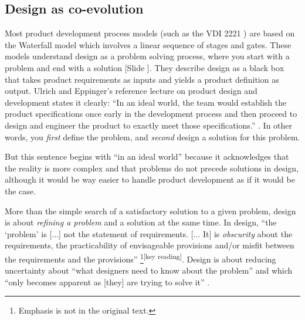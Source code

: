\documentclass{article}
\newcounter{slide}
\begin{document}
\subsection{Design as co-evolution}
\label{sec:coevolution}
Most product development process models (such as the VDI 2221 \cite{vdi1993design}) are based on the Waterfall model which involves a linear sequence of stages and gates. These models understand design as a problem solving process, where you start with a problem and end with a solution {\color{blue}[Slide ]}. They describe design as a black box that takes product requirements as inputs and yields a product definition as output. Ulrich and Eppinger's reference lecture on product design and development states it clearly: ``In an ideal world, the team would establish the product specifications once early in the development process and then proceed to design and engineer the product to exactly meet those specifications.'' \cite[p. 73]{ulrichProductDesignDevelopment2011}. In other words, you \emph{first} define the problem, and \emph{second} design a solution for this problem. 

But this sentence begins with ``in an ideal world'' because it acknowledges that the reality is more complex and that problems do not precede solutions in design, although it would be way easier to handle product development as if it would be the case. 

More than the simple search of a satisfactory solution to a given problem, design is about \emph{refining a problem} and a solution at the same time. In design, ``the `problem' is [...] not the statement of requirements. [... It] is \emph{obscurity} about the requirements, the practicability of envisageable provisions and/or misfit between the requirements and the provisions'' \cite{archerDesignDiscipline1979}\footnote{Emphasis is not in the original text.}\textsuperscript{\color{Magenta}[key reading]}. Design is about reducing uncertainty about ``what designers need to know about the problem'' and which ``only becomes apparent as [they] are trying to solve it'' \cite{crossDesignThinkingUnderstanding2011}. 
\end{document}
